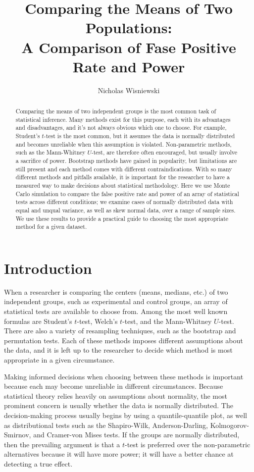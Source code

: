 \documentclass[10pt]{article} %
\title{Comparing the Means of Two Populations: \\
	\large A Comparison of Fase Positive Rate and Power}
\author{Nicholas Wisniewski}
\affil{Department of Medicine (Cardiology)\\ Department of Integrative Biology and Physiology \\University of California, Los Angeles}
\begin{document}
\maketitle
\begin{abstract}
        \noindent Comparing the means of two independent groups is the most common task of statistical inference. Many methods exist for this purpose, each with its advantages and disadvantages, and it's not always obvious which one to choose. For example, Student's $t$-test is the most common, but it assumes the data is normally distributed and becomes unreliable when this assumption is violated. Non-parametric methods, such as the Mann-Whitney $U$-test, are therefore often encouraged, but usually involve a sacrifice of power. Bootstrap methods have gained in popularity, but limitations are still present and each method comes with different contraindications. With so many different methods and pitfalls available, it is important for the researcher to have a measured way to make decisions about statistical methodology. Here we use Monte Carlo simulation to compare the false positive rate and power of an array of statistical tests across different conditions; we examine cases of normally distributed data with equal and unqual variance, as well as skew normal data, over a range of sample sizes. We use these results to provide a practical guide to choosing the most appropriate method for a given dataset. 
    \end{abstract}
\section{Introduction}

When a researcher is comparing the centers (means, medians, etc.) of two independent groups, such as experimental and control groups, an array of statistical tests are available to choose from. Among the most well known formulas are Student's $t$-test, Welch's $t$-test, and the Mann-Whitney $U$-test. There are also a variety of resampling techniques, such as the bootstrap and permutation tests. Each of these methods imposes different assumptions about the data, and it is left up to the researcher to decide which method is most appropriate in a given circumstance. 

Making informed decisions when choosing between these methods is important because each may become unreliable in different circumstances. Because statistical theory relies heavily on assumptions about normality, the most prominent concern is usually whether the data is normally distributed. The decision-making process usually begins by using a quantile-quantile plot, as well as distributional tests such as the Shapiro-Wilk, Anderson-Darling, Kolmogorov-Smirnov, and Cramer-von Mises tests. If the groups are normally distributed, then the prevailing argument is that a $t$-test is preferred over the non-parametric alternatives because it will have more power; it will have a better chance at detecting a true effect. 
\end{document}
